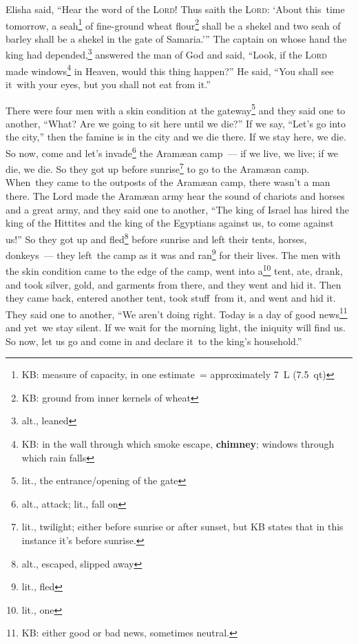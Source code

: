 
\begin{inparaenum}
     Elisha said, ``Hear the word of the \textsc{Lord}! Thus saith the \textsc{Lord}: `About this\understood\ time tomorrow, a seah\footnote{KB: measure of capacity, in one estimate~= approximately 7~L (7.5~qt)} of fine-ground wheat flour\footnote{KB: ground from inner kernels of wheat} shall be a shekel and two seah of barley shall be a shekel in the gate of Samaria.'\thinspace''%
     The captain on whose hand the king had depended,\footnote{alt., leaned} answered the man of God and said, ``Look, if the \textsc{Lord} made windows\footnote{KB: in the wall through which smoke escape, \textbf{chimney}; windows through which rain falls} in Heaven, would this thing happen?'' He said, ``You shall see it\understood\ with your eyes, but you shall not eat from it.''%
    
     There were four men with a skin condition at the gateway\footnote{lit., the entrance/opening of the gate} and they said one to another, ``What? Are we going to sit here until we die?''%
     If we say, ``Let's go into the city,'' then the famine is in the city and we die there. If we stay here, we die. So now, come and let's invade\footnote{alt., attack; lit., fall on} the Aram\ae{}an camp~--- if we live, we live; if we die, we die.%
     So they got up before sunrise\footnote{lit., twilight; either before sunrise or after sunset, but KB states that in this instance it's before sunrise.} to go to the Aram\ae{}an camp. When\understood\ they came to the outposts of the Aram\ae{}an camp, there wasn't a man there.%
     The Lord made the Aram\ae{}an army hear the sound of chariots and horses and a great army, and they said one to another, ``The king of Israel has hired the king of the Hittites and the king of the Egyptians against us, to come against us!''%
     So they got up and fled\footnote{alt., escaped, slipped away} before sunrise and left their tents, horses, donkeys~--- they left\understood\ the camp as it was and ran\footnote{lit., fled} for their lives.%
     The men with the skin condition came to the edge of the camp, went into a\footnote{lit., one} tent, ate, drank, and took silver, gold, and garments from there, and they went and hid it. Then they came back, entered another tent, took stuff\understood\ from it, and went and hid it.%
     They said one to another, ``We aren't doing right. Today is a day of good news\footnote{KB: either good or bad news, sometimes neutral.} and yet\understood\ we stay silent. If we wait for the morning light, the iniquity will find us. So now, let us go and come in and declare it\understood\ to the king's household.''%
\end{inparaenum}
